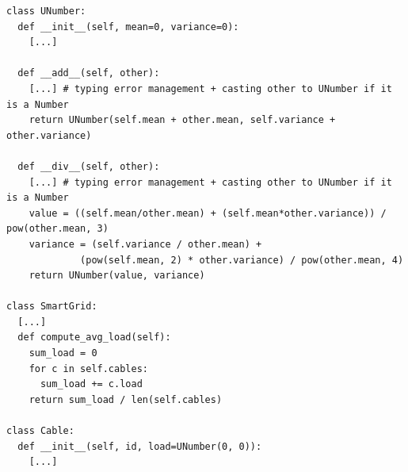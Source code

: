 \begin{lstlisting}[style=pythonStyle, caption=Manual management of uncertainty in Python, label=lst:example-from-scratch, linewidth=0.97\textwidth
]
class UNumber:
  def __init__(self, mean=0, variance=0):
    [...]
    
  def __add__(self, other):
    [...] # typing error management + casting other to UNumber if it is a Number
    return UNumber(self.mean + other.mean, self.variance + other.variance)
    
  def __div__(self, other):
    [...] # typing error management + casting other to UNumber if it is a Number
    value = ((self.mean/other.mean) + (self.mean*other.variance)) / pow(other.mean, 3)
    variance = (self.variance / other.mean) +
             (pow(self.mean, 2) * other.variance) / pow(other.mean, 4)
    return UNumber(value, variance)

class SmartGrid:
  [...]
  def compute_avg_load(self):
    sum_load = 0
    for c in self.cables:
      sum_load += c.load
    return sum_load / len(self.cables)
    
class Cable:
  def __init__(self, id, load=UNumber(0, 0)):
    [...]
\end{lstlisting}

